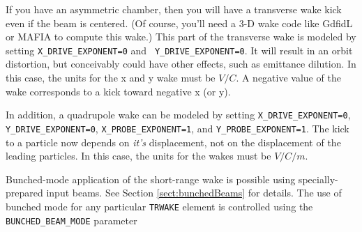 If you have an asymmetric chamber, then you will have a transverse
wake kick even if the beam is centered.  (Of course, you'll need a 3-D
wake code like GdfidL or MAFIA to compute this wake.)  This part of
the transverse wake is modeled by setting {\tt X\_DRIVE\_EXPONENT=0} and {\tt
Y\_DRIVE\_EXPONENT=0}.  It will result in an orbit distortion, but conceivably
could have other effects, such as emittance dilution.  In this case, 
the units for the x and y wake must be $V/C$.  A negative value of the wake
corresponds to a kick toward negative x (or y).

In addition, a quadrupole wake can be modeled by setting {\tt X\_DRIVE\_EXPONENT=0}, {\tt
Y\_DRIVE\_EXPONENT=0}, {\tt X\_PROBE\_EXPONENT=1}, and {\tt Y\_PROBE\_EXPONENT=1}.
The kick to a particle now depends on {\em it's} displacement, not on the displacement of
the leading particles.
In this case, the units for the wakes must be $V/C/m$.

Bunched-mode application of the short-range wake is possible using specially-prepared input
beams. 
See Section \ref{sect:bunchedBeams} for details.
The use of bunched mode for any particular \verb|TRWAKE| element is controlled using the \verb|BUNCHED_BEAM_MODE| parameter
